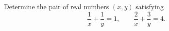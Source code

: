 Determine the pair of real numbers $(x,y)$ satisfying
\[
\dfrac{1}{x}+\dfrac{1}{y}=1,\qquad\dfrac{2}{x}+\dfrac{3}{y}=4 .
\]
